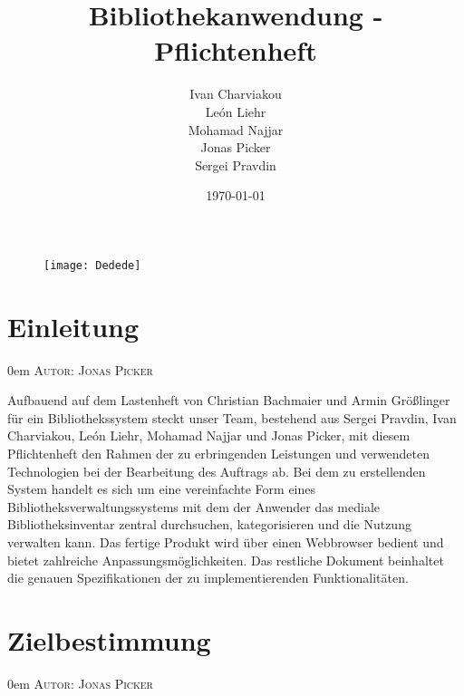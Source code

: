 \documentclass{article}
\title{Bibliothekanwendung - Pflichtenheft}
\date{\today}
\author{
	Ivan Charviakou\\
	León Liehr\\
	Mohamad Najjar\\
	Jonas Picker\\
	Sergei Pravdin
}
\makeatletter
\newcommand{\sectionauthor}[1]{
	{\parindent 0em \large \scshape Autor: #1 \par \nobreak \vspace*{2em}}
	\@afterheading
}
\makeatother
\begin{document}
\maketitle
\begin{figure}[h]
	\centering
	\texttt{[image: Dedede]}
\end{figure}
\newpage

\tableofcontents
\newpage

\section{Einleitung} %
\sectionauthor{Jonas Picker}
Aufbauend auf dem Lastenheft von Christian Bachmaier und Armin Größlinger für ein Bibliothekssystem steckt unser Team, bestehend aus Sergei Pravdin, Ivan Charviakou, León Liehr, Mohamad Najjar und Jonas Picker, mit diesem Pflichtenheft den Rahmen der zu erbringenden Leistungen und verwendeten Technologien bei der Bearbeitung des Auftrags ab. Bei dem zu erstellenden System handelt es sich um eine vereinfachte Form eines Bibliotheksverwaltungssystems mit dem der Anwender das mediale Bibliotheksinventar zentral durchsuchen, kategorisieren und die Nutzung verwalten kann. Das fertige Produkt wird über einen Webbrowser bedient und bietet zahlreiche Anpassungsmöglichkeiten. Das restliche Dokument beinhaltet die genauen Spezifikationen der zu implementierenden Funktionalitäten.
\newpage

\section{Zielbestimmung} %
\sectionauthor{Jonas Picker}
\end{document}
